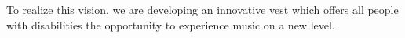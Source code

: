 To realize this vision, we are developing an innovative vest which offers all people with disabilities the opportunity to experience music on a new level.
